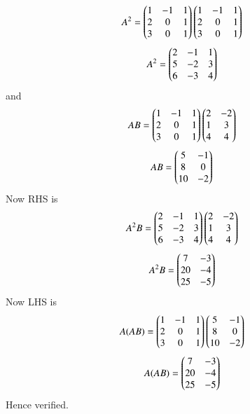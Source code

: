  \begin{align}
     A^{2}=\begin{pmatrix}1&-1&1\\2&0&1\\3&0&1\end{pmatrix}\begin{pmatrix}1&-1&1\\2&0&1\\3&0&1\end{pmatrix}
\end{align}
\begin{align}
     A^{2}=\begin{pmatrix}2&-1&1\\5&-2&3\\6&-3&4\end{pmatrix}
 \end{align}
 and
 \begin{align}
   AB=\begin{pmatrix}1&-1&1\\2&0&1\\3&0&1\end{pmatrix}\begin{pmatrix}2&-2\\1&3\\4&4\end{pmatrix}
\end{align}
\begin{align}
     AB=\begin{pmatrix}5&-1\\8&0\\10&-2\end{pmatrix}
 \end{align}
  Now RHS is 
  \begin{align}
     A^{2}B=\begin{pmatrix}2&-1&1\\5&-2&3\\6&-3&4\end{pmatrix}\begin{pmatrix}2&-2\\1&3\\4&4\end{pmatrix}
 \end{align}
 \begin{align}
    A^{2}B=\begin{pmatrix}7&-3\\20&-4\\25&-5\end{pmatrix}
 \end{align}
  Now LHS is 
  \begin{align}
     A(AB)=\begin{pmatrix}1&-1&1\\2&0&1\\3&0&1\end{pmatrix}\begin{pmatrix}5&-1\\8&0\\10&-2\end{pmatrix}
 \end{align}
 \begin{align}
    A(AB)=\begin{pmatrix}7&-3\\20&-4\\25&-5\end{pmatrix}
 \end{align}
 Hence verified.
